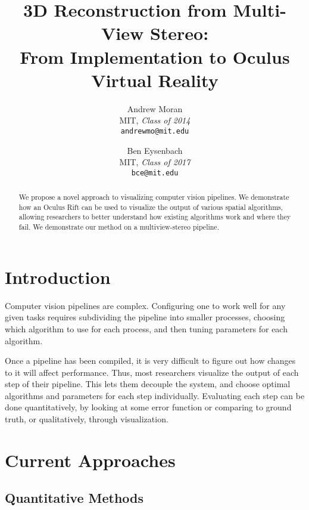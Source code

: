 \documentclass[10pt,twocolumn,letterpaper]{article}
\begin{document}
\title{3D Reconstruction from Multi-View Stereo:\\ From Implementation to Oculus Virtual Reality}

\author{Andrew Moran\\
  MIT, \textit{Class of 2014}\\
  {\tt\small andrewmo@mit.edu}
\and
Ben Eysenbach\\
MIT, \textit{Class of 2017}\\
{\tt\small bce@mit.edu}
}

\maketitle

\begin{abstract}
   We propose a novel approach to visualizing computer vision pipelines. We demonstrate how an Oculus Rift can be used to visualize the output of various spatial algorithms, allowing researchers to better understand how existing algorithms work and where they fail. We demonstrate our method on a multiview-stereo pipeline.
\end{abstract}

\section{Introduction}
Computer vision pipelines are complex. Configuring one to work well for any given tasks requires subdividing the pipeline into smaller processes, choosing which algorithm to use for each process, and then tuning parameters for each algorithm.

Once a pipeline has been compiled, it is very difficult to figure out how changes to it will affect performance. Thus, most researchers visualize the output of each step of their pipeline. This lets them decouple the system, and choose optimal algorithms and parameters for each step individually. Evaluating each step can be done quantitatively, by looking at some error function or comparing to ground truth, or qualitatively, through visualization.

\section{Current Approaches}

\subsection{Quantitative Methods}
\end{document}
